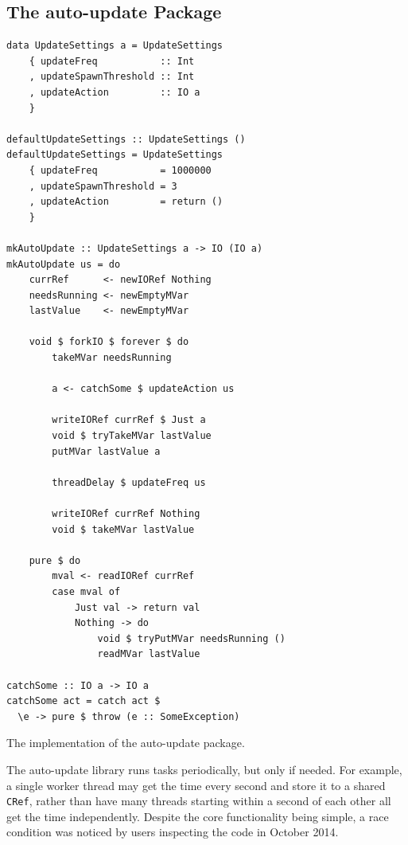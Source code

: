 \subsection{The auto-update Package}

\begin{listing}
  \centering
  \begin{minipage}{0.5\textwidth}
  \begin{verbatim}
data UpdateSettings a = UpdateSettings
    { updateFreq           :: Int
    , updateSpawnThreshold :: Int
    , updateAction         :: IO a
    }

defaultUpdateSettings :: UpdateSettings ()
defaultUpdateSettings = UpdateSettings
    { updateFreq           = 1000000
    , updateSpawnThreshold = 3
    , updateAction         = return ()
    }

mkAutoUpdate :: UpdateSettings a -> IO (IO a)
mkAutoUpdate us = do
    currRef      <- newIORef Nothing
    needsRunning <- newEmptyMVar
    lastValue    <- newEmptyMVar

    void $ forkIO $ forever $ do
        takeMVar needsRunning

        a <- catchSome $ updateAction us

        writeIORef currRef $ Just a
        void $ tryTakeMVar lastValue
        putMVar lastValue a

        threadDelay $ updateFreq us

        writeIORef currRef Nothing
        void $ takeMVar lastValue

    pure $ do
        mval <- readIORef currRef
        case mval of
            Just val -> return val
            Nothing -> do
                void $ tryPutMVar needsRunning ()
                readMVar lastValue

catchSome :: IO a -> IO a
catchSome act = catch act $
  \e -> pure $ throw (e :: SomeException)
  \end{verbatim}
  \end{minipage}
  \caption{The implementation of the auto-update package.}\label{lst:example-autoupdate}
\end{listing}

The auto-update\cite{auto_update} library runs tasks periodically, but
only if needed.  For example, a single worker thread may get the time
every second and store it to a shared \verb|CRef|, rather than have
many threads starting within a second of each other all get the time
independently.  Despite the core functionality being simple, a race
condition was noticed by users inspecting the code in October 2014.

